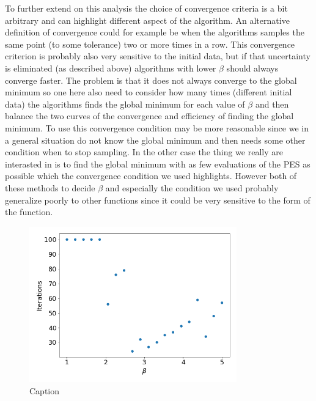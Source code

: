 \documentclass[11pt,a4paper]{article}
\begin{document}
To further extend on this analysis the choice of convergence criteria is a bit arbitrary and can highlight different aspect of the algorithm. An alternative definition of convergence could for example be when the algorithms samples the same point (to some tolerance) two or more times in a row. This convergence criterion is probably also very sensitive to the initial data, but if that uncertainty is eliminated (as described above) algorithms with lower $\beta$ should always converge faster. The problem is that it does not always converge to the global minimum so one here also need to consider how many times (different initial data) the algorithms finds the global minimum for each value of $\beta$ and then balance the two curves of the convergence and efficiency of finding the global minimum. To use this convergence condition may be more reasonable since we in a general situation do not know the global minimum and then needs some other condition when to stop sampling. In the other case the thing we really are interasted in is to find the global minimum with as few evaluations of the PES as possible which the convergence condition we used highlights. However both of these methods to decide $\beta$ and especially the condition we used probably  generalize poorly to other functions since it could be very sensitive to the form of the function.

\begin{figure}[H]
    \centering
    \includegraphics[width = 0.8\textwidth]{figures/task3_iter.png}
    \caption{Caption}
    \label{fig:task3_iter}
\end{figure}
\end{document}

